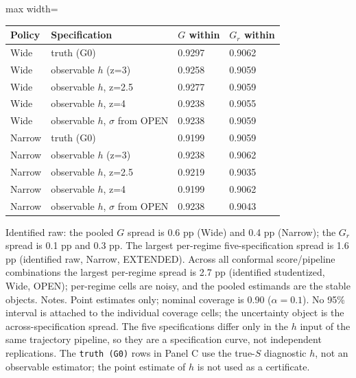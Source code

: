 \begin{table}[!htbp]
\begin{adjustbox}{max width=\linewidth}
\begin{tabular}{@{}llll@{}}
\toprule
Policy & Specification & $G$ within & $G_r$ within \\
\midrule
Wide & truth (G0) & 0.9297 & 0.9062 \\
Wide & observable $h$ (z=3) & 0.9258 & 0.9059 \\
Wide & observable $h$, z=2.5 & 0.9277 & 0.9059 \\
Wide & observable $h$, z=4 & 0.9238 & 0.9055 \\
Wide & observable $h$, $\sigma$ from OPEN & 0.9238 & 0.9059 \\
Narrow & truth (G0) & 0.9199 & 0.9059 \\
Narrow & observable $h$ (z=3) & 0.9238 & 0.9062 \\
Narrow & observable $h$, z=2.5 & 0.9219 & 0.9035 \\
Narrow & observable $h$, z=4 & 0.9199 & 0.9062 \\
Narrow & observable $h$, $\sigma$ from OPEN & 0.9238 & 0.9043 \\
\bottomrule
\end{tabular}
\end{adjustbox}
\vspace{0.5em}
\par\noindent\begin{minipage}{\linewidth}\raggedright{\scriptsize Identified raw: the pooled $G$ spread is 0.6 pp (Wide) and 0.4 pp (Narrow); the $G_r$ spread is 0.1 pp and 0.3 pp. The largest per-regime five-specification spread is 1.6 pp (identified raw, Narrow, EXTENDED). Across all conformal score/pipeline combinations the largest per-regime spread is 2.7 pp (identified studentized, Wide, OPEN); per-regime cells are noisy, and the pooled estimands are the stable objects. Notes. Point estimates only; nominal coverage is 0.90 ($\alpha=0.1$). No 95\% interval is attached to the individual coverage cells; the uncertainty object is the across-specification spread. The five specifications differ only in the $h$ input of the same trajectory pipeline, so they are a specification curve, not independent replications. The \texttt{truth (G0)} rows in Panel C use the true-$S$ diagnostic $h$, not an observable estimator; the point estimate of $h$ is not used as a certificate.}\end{minipage}\par

\end{table}
